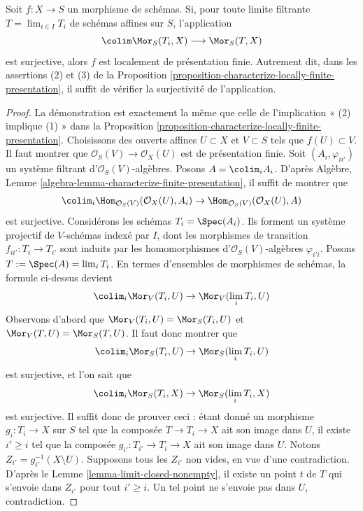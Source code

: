\begin{lemma}
\label{lemma-surjection-is-enough}
Soit $f : X \to S$ un morphisme de schémas. Si, pour toute limite filtrante
$T = \lim_{i \in I} T_i$ de schémas affines sur $S$, l'application
$$
\colim \Mor_S(T_i, X) \longrightarrow \Mor_S(T, X)
$$
est surjective, alors $f$ est localement de présentation finie. Autrement
dit, dans les assertions (2) et (3) de la
Proposition \ref{proposition-characterize-locally-finite-presentation}, il
suffit de vérifier la surjectivité de l'application.
\end{lemma}

\begin{proof}
La démonstration est exactement la même que celle de l'implication
« (2) implique (1) » dans la
Proposition \ref{proposition-characterize-locally-finite-presentation}.
Choisissons des ouverts affines $U \subset X$ et $V \subset S$ tels que
$f(U) \subset V$. Il faut montrer que
$\mathcal{O}_S(V) \to \mathcal{O}_X(U)$ est de présentation finie. Soit
$(A_i, \varphi_{ii'})$ un système filtrant d'$\mathcal{O}_S(V)$-algèbres.
Posons $A = \colim_i A_i$. D'après Algèbre,
Lemme \ref{algebra-lemma-characterize-finite-presentation}, il suffit de
montrer que
$$
\colim_i \Hom_{\mathcal{O}_S(V)}(\mathcal{O}_X(U), A_i) \to
\Hom_{\mathcal{O}_S(V)}(\mathcal{O}_X(U), A)
$$
est surjective. Considérons les schémas $T_i = \Spec(A_i)$. Ils forment un
système projectif de $V$-schémas indexé par $I$, dont les morphismes de
transition $f_{ii'} : T_i \to T_{i'}$ sont induits par les homomorphismes
d'$\mathcal{O}_S(V)$-algèbres $\varphi_{i'i}$. Posons
$T := \Spec(A) = \lim_i T_i$. En termes d'ensembles de morphismes de
schémas, la formule ci-dessus devient
$$
\colim_i \Mor_V(T_i, U) \to \Mor_V(\lim_i T_i, U)
$$
Observons d'abord que
$\Mor_V(T_i, U) = \Mor_S(T_i, U)$
et
$\Mor_V(T, U) = \Mor_S(T, U)$.
Il faut donc montrer que
$$
\colim_i \Mor_S(T_i, U) \to
\Mor_S(\lim_i T_i, U)
$$
est surjective, et l'on sait que
$$
\colim_i \Mor_S(T_i, X) \to
\Mor_S(\lim_i T_i, X)
$$
est surjective. Il suffit donc de prouver ceci : étant donné un morphisme
$g_i : T_i \to X$ sur $S$ tel que la composée $T \to T_i \to X$ ait son
image dans $U$, il existe $i' \geq i$ tel que la composée
$g_{i'} : T_{i'} \to T_i \to X$ ait son image dans $U$. Notons
$Z_{i'} = g_{i'}^{-1}(X \setminus U)$. Supposons tous les $Z_{i'}$ non vides,
en vue d'une contradiction. D'après le
Lemme \ref{lemma-limit-closed-nonempty}, il existe un point $t$ de $T$ qui
s'envoie dans $Z_{i'}$ pour tout $i' \geq i$. Un tel point ne s'envoie pas
dans $U$, contradiction.
\end{proof}

